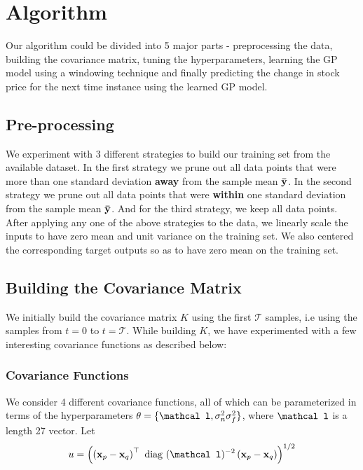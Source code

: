 \documentclass{article} %
\def\bfx{\mathbf x}
\def\bftheta{\mathbf \theta}
\def\bfl{\mathbf \mathcal l}
\def\diag{\mbox{ diag }}
\begin{document}



\section{Algorithm}

Our algorithm could be divided into 5 major parts - preprocessing the data, building the covariance matrix, tuning the hyperparameters, learning the GP model using a windowing technique and finally predicting the change in stock price for the next time instance using the learned GP model. 

\subsection{Pre-processing}
\label{sec:strategy}

We experiment with 3 different strategies to build our training set from the available dataset. In the first strategy we prune out all data points that were more than one standard deviation \textbf{away} from the sample mean $\bf\bar{y}$. In the second strategy we prune out all data points that were \textbf{within} one standard deviation from the sample mean $\bf\bar{y}$. And for the third strategy, we keep all data points. After applying any one of the above strategies to the data, we linearly scale the inputs to have zero mean and unit variance on the training set. We also centered the corresponding target outputs so as to have zero mean on the training set.

\subsection{Building the Covariance Matrix}

We initially build the covariance matrix $K$ using the first $\mathcal{T}$ samples, i.e using the samples from $t = 0$ to $t = \mathcal{T}$. While building $K$, we have experimented with a few interesting covariance functions as described below:  

\subsubsection{Covariance Functions}
We consider 4 different covariance functions, all of which can be parameterized in terms of the hyperparameters $\bftheta = \{\bfl, \sigma_n^2 \sigma_f^2\}$, where $\bfl$ is a length 27 vector.
Let
\begin{equation}
	u = \left( \left( \bfx_p - \bfx_q \right)^\top \diag(\bfl)^{-2} \left( \bfx_p - \bfx_q \right) \right)^{1/2}
\end{equation}
\end{document}
